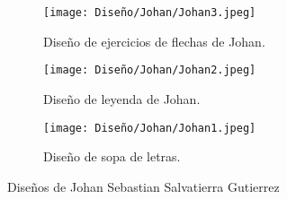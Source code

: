 \begin{figure}[h!]
  \ContinuedFloat
  \begin{subfigure}{\textwidth}
    \centering
    \texttt{[image: Diseño/Johan/Johan3.jpeg]}
    \caption{Diseño de ejercicios de flechas de Johan.}
    \label{Johan3}
  \end{subfigure}

  \begin{subfigure}{\textwidth}
    \centering
    \texttt{[image: Diseño/Johan/Johan2.jpeg]}
    \caption{Diseño de leyenda de Johan.}
    \label{Johan2}
  \end{subfigure}

  \begin{subfigure}{\textwidth}
    \centering
    \texttt{[image: Diseño/Johan/Johan1.jpeg]}
    \caption{Diseño de sopa de letras.}
    \label{Johan1}
  \end{subfigure}

  \caption{Diseños de Johan Sebastian Salvatierra Gutierrez}
  \label{fig:disenyoJohan}
\end{figure}























































































